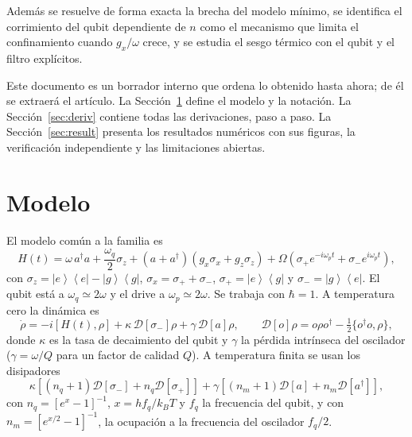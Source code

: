 \documentclass[11pt,a4paper]{article}
\newcommand{\ket}[1]{\left|#1\right\rangle}
\newcommand{\bra}[1]{\left\langle#1\right|}
\newcommand{\spl}{\sigma_{+}}
\newcommand{\smi}{\sigma_{-}}
\newcommand{\Pe}{\ket{e}\!\bra{e}}
\newcommand{\Pg}{\ket{g}\!\bra{g}}
\newcommand{\D}{\mathcal{D}}
\theoremstyle{definition}
\begin{document}
Además se resuelve de forma exacta la brecha del modelo mínimo, se identifica el corrimiento del qubit dependiente de $n$ como el mecanismo que limita el confinamiento cuando $g_x/\omega$ crece, y se estudia el sesgo térmico con el qubit y el filtro explícitos.

Este documento es un borrador interno que ordena lo obtenido hasta ahora; de él se extraerá el artículo. La Sección~\ref{sec:modelo} define el modelo y la notación. La Sección~\ref{sec:deriv} contiene todas las derivaciones, paso a paso. La Sección~\ref{sec:result} presenta los resultados numéricos con sus figuras, la verificación independiente y las limitaciones abiertas.

\section{Modelo}
\label{sec:modelo}


El modelo común a la familia es
\begin{equation}
H(t)=\omega\,a^{\dagger}a+\frac{\omega_q}{2}\sigma_z+(a+a^{\dagger})\left(g_x\sigma_x+g_z\sigma_z\right)+\Omega\left(\spl e^{-i\omega_pt}+\smi e^{i\omega_pt}\right),
\label{eq:H}
\end{equation}
con $\sigma_z=\Pe-\Pg$, $\sigma_x=\spl+\smi$, $\spl=\ket{e}\bra{g}$ y $\smi=\ket{g}\bra{e}$. El qubit está a $\omega_q\simeq2\omega$ y el drive a $\omega_p\simeq2\omega$. Se trabaja con $\hbar=1$. A temperatura cero la dinámica es
\begin{equation}
\dot\rho=-i[H(t),\rho]+\kappa\,\D[\smi]\rho+\gamma\,\D[a]\rho,\qquad \D[o]\rho=o\rho o^{\dagger}-\tfrac12\{o^{\dagger}o,\rho\},
\label{eq:ME}
\end{equation}
donde $\kappa$ es la tasa de decaimiento del qubit y $\gamma$ la pérdida intrínseca del oscilador ($\gamma=\omega/Q$ para un factor de calidad $Q$). A temperatura finita se usan los disipadores
\begin{equation}
\kappa\left[(n_q+1)\D[\smi]+n_q\D[\spl]\right]+\gamma\left[(n_m+1)\D[a]+n_m\D[a^{\dagger}]\right],
\label{eq:ME_T}
\end{equation}
con $n_q=[e^{x}-1]^{-1}$, $x=hf_q/k_BT$ y $f_q$ la frecuencia del qubit, y con $n_m=[e^{x/2}-1]^{-1}$, la ocupación a la frecuencia del oscilador $f_q/2$.
\end{document}
